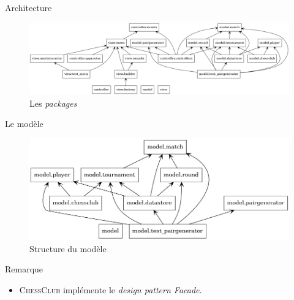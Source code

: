 \begin{frame}{Architecture}
  \begin{center}
    \begin{figure}
      \includegraphics[scale=0.205]{img/architecture.png}
      \caption{Les \textit{packages}}
    \end{figure}
  \end{center}
\end{frame}

\begin{frame}{Le modèle}
  \begin{center}
    \begin{figure}
      \includegraphics[scale=0.25]{img/model.png}
      \caption{Structure du modèle}
    \end{figure}
  \end{center}

  \begin{block}{Remarque}
    \begin{itemize}
    \item \textsc{ChessClub} implémente le \textit{design pattern
      Facade}.
    \end{itemize}
    
  \end{block}
\end{frame}


